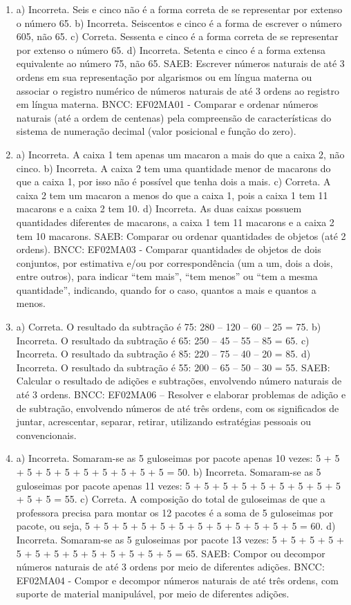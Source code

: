 \begin{enumerate}
\item
a) Incorreta. Seis e cinco não é a forma correta de se representar por extenso o número 65.
b) Incorreta. Seiscentos e cinco é a forma de escrever o número 605, não 65.
c) Correta. Sessenta e cinco é a forma correta de se representar por extenso o número 65.
d) Incorreta. Setenta e cinco é a forma extensa equivalente ao número 75, não 65.
SAEB: Escrever números naturais de até 3 ordens em sua
representação por algarismos ou em língua materna ou associar o registro
numérico de números naturais de até 3 ordens ao registro em língua
materna.
BNCC: EF02MA01 - Comparar e ordenar números naturais (até a ordem de
centenas) pela compreensão de características do sistema de numeração
decimal (valor posicional e função do zero).

\item
a) Incorreta. A caixa 1 tem apenas um macaron a mais do que a caixa 2, não cinco.
b) Incorreta. A caixa 2 tem uma quantidade menor de macarons do que a
caixa 1, por isso não é possível que tenha dois a mais.
c) Correta. A caixa 2 tem um macaron a menos do que a caixa 1, pois a
caixa 1 tem 11 macarons e a caixa 2 tem 10.
d) Incorreta. As duas caixas possuem quantidades diferentes de macarons,
a caixa 1 tem 11 macarons e a caixa 2 tem 10 macarons.
SAEB: Comparar ou ordenar quantidades de objetos (até 2 ordens).
BNCC: EF02MA03 - Comparar quantidades de objetos de dois conjuntos, por
estimativa e/ou por correspondência (um a um, dois a dois, entre
outros), para indicar ``tem mais'', ``tem menos'' ou ``tem a mesma
quantidade'', indicando, quando for o caso, quantos a mais e quantos a
menos.

\item
a) Correta. O resultado da subtração é 75: 280 -- 120 -- 60 -- 25 = 75.
b) Incorreta. O resultado da subtração é 65: 250 -- 45 -- 55 -- 85 = 65.
c) Incorreta. O resultado da subtração é 85: 220 -- 75 -- 40 -- 20 = 85.
d) Incorreta. O resultado da subtração é 55: 200 -- 65 -- 50 -- 30 = 55.
SAEB: Calcular o resultado de adições e subtrações, envolvendo
número naturais de até 3 ordens.
BNCC: EF02MA06 -- Resolver e elaborar problemas de adição e de subtração,
envolvendo números de até três ordens, com os significados de juntar,
acrescentar, separar, retirar, utilizando estratégias pessoais ou convencionais.

\item
a) Incorreta. Somaram-se as 5 guloseimas por pacote apenas 10 vezes: 5 + 5 +
5 + 5 + 5 + 5 + 5 + 5 + 5 + 5 = 50.
b) Incorreta. Somaram-se as 5 guloseimas por pacote apenas 11 vezes: 5 + 5 +
5 + 5 + 5 + 5 + 5 + 5 + 5 + 5 + 5 = 55.
c) Correta. A composição do total de guloseimas de que a professora precisa
para montar os 12 pacotes é a soma de 5 guloseimas por pacote, ou seja,
5 + 5 + 5 + 5 + 5 + 5 + 5 + 5 + 5 + 5 + 5 + 5 = 60.
d) Incorreta. Somaram-se as 5 guloseimas por pacote 13 vezes: 5 + 5 + 5 + 5 +
5 + 5 + 5 + 5 + 5 + 5 + 5 + 5 + 5 = 65.
SAEB: Compor ou decompor números naturais de até 3 ordens por meio de diferentes adições.
BNCC: EF02MA04 - Compor e decompor números naturais de até três ordens,
com suporte de material manipulável, por meio de diferentes adições.


\end{enumerate}
